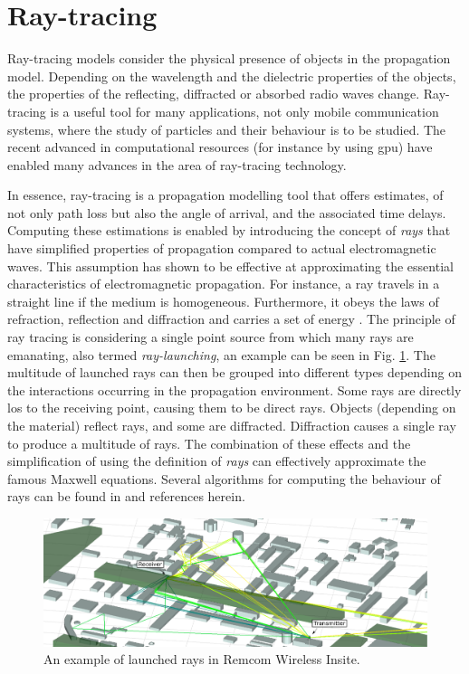 \section{Ray-tracing}\label{sec:ray-tracing}

Ray-tracing models consider the physical presence of objects in the propagation model. Depending on the wavelength and the dielectric properties of the objects, the properties of the reflecting, diffracted or absorbed radio waves change. Ray-tracing is a useful tool for many applications, not only mobile communication systems, where the study of particles and their behaviour is to be studied. The recent advanced in computational resources (for instance by using \gls{gpu}) have enabled many advances in the area of ray-tracing technology.

In essence, ray-tracing is a propagation modelling tool that offers estimates, of not only path loss but also the angle of arrival, and the associated time delays. Computing these estimations is enabled by introducing the concept of \emph{rays} that have simplified properties of propagation compared to actual electromagnetic waves. This assumption has shown to be effective at approximating the essential characteristics of electromagnetic propagation. For instance, a ray travels in a straight line if the medium is homogeneous. Furthermore, it obeys the laws of refraction, reflection and diffraction and carries a set of energy \cite{Yun2015}. 
The principle of ray tracing is considering a single point source from which many rays are emanating, also termed \emph{ray-launching}, an example can be seen in Fig. \ref{fig:raytracing_launching}. The multitude of launched rays can then be grouped into different types depending on the interactions occurring in the propagation environment. Some rays are directly \acrlong{los} to the receiving point, causing them to be direct rays. Objects (depending on the material) reflect rays, and some are diffracted. Diffraction causes a single ray to produce a multitude of rays. The combination of these effects and the simplification of using the definition of \emph{rays} can effectively approximate the famous Maxwell equations.  Several algorithms for computing the behaviour of rays can be found in \cite{Yun2015} and references herein.


\begin{figure}
    \centering
    \includegraphics{chapters/part_pathloss/figures/RemcomRayLaunchingv2.png}
    \caption{An example of launched rays in Remcom Wireless Insite.}
    \label{fig:raytracing_launching}
\end{figure}

